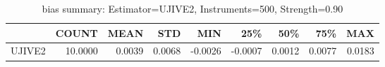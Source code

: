 \begin{table}[ht]
\centering
\caption{bias summary: Estimator=UJIVE2, Instruments=500, Strength=0.90}
\begin{tabular}{lrrrrrrrr}
\toprule
 & COUNT & MEAN & STD & MIN & 25\% & 50\% & 75\% & MAX \\
\midrule
UJIVE2 & 10.0000 & 0.0039 & 0.0068 & -0.0026 & -0.0007 & 0.0012 & 0.0077 & 0.0183 \\
\bottomrule
\end{tabular}
\end{table}

